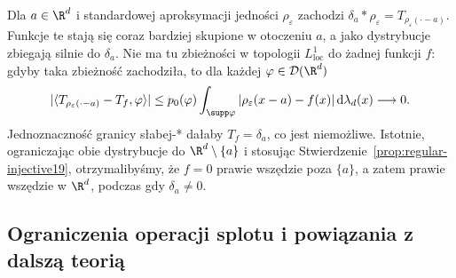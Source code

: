 \begin{przyklad}
\label{ex:delta-smooth21}
Dla $a\in\R^d$ i standardowej aproksymacji jedności
$\rho_\varepsilon$ zachodzi
$\delta_a*\rho_\varepsilon=T_{\rho_\varepsilon(\cdot-a)}$.
Funkcje te stają się coraz bardziej skupione
w otoczeniu $a$, a jako dystrybucje zbiegają
silnie do $\delta_a$. Nie ma tu zbieżności w topologii $L^1_{\mathrm{loc}}$
do żadnej funkcji $f$: gdyby taka zbieżność zachodziła,
to dla każdej $\varphi\in\mathcal D(\R^d)$
\[
 |\langle T_{\rho_\varepsilon(\cdot-a)}-T_f,\varphi\rangle|
 \le p_0(\varphi)
 \int_{\supp\varphi}|\rho_\varepsilon(x-a)-f(x)|
 \,\mathrm d\lambda_d(x)\longrightarrow0.
\]
Jednoznaczność granicy słabej-* dałaby $T_f=\delta_a$,
co jest niemożliwe. Istotnie, ograniczając obie dystrybucje do
$\R^d\setminus\{a\}$ i stosując
Stwierdzenie~\ref{prop:regular-injective19}, otrzymalibyśmy, że
$f=0$ prawie wszędzie poza $\{a\}$, a zatem prawie wszędzie
w $\R^d$, podczas gdy $\delta_a\ne0$.
\end{przyklad}

\subsection{Ograniczenia operacji splotu i powiązania z dalszą teorią}

